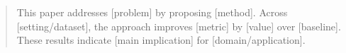 \begin{abstract}
This paper addresses [problem] by proposing [method].
Across [setting/dataset], the approach improves [metric] by [value] over [baseline].
These results indicate [main implication] for [domain/application].
\end{abstract}
